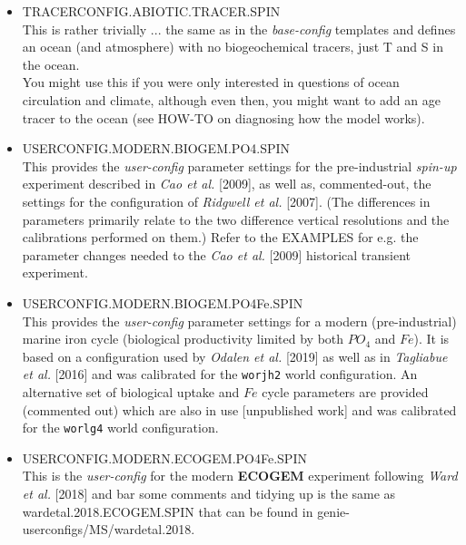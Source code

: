 \documentclass[11pt,fleqn]{book} %
\begin{document}
\begin{itemize}[noitemsep]

\vspace{2mm}
\item \textsf{\footnotesize TRACERCONFIG.ABIOTIC.TRACER.SPIN}
\vspace{1mm}
\\This is rather trivially ... the same as in the \textit{base-config} templates and defines an ocean (and atmosphere) with no biogeochemical tracers, just T and S in the ocean.
\\You might use this if you were only interested in questions of ocean circulation and climate, although even then, you might want to add an age tracer to the ocean (see HOW-TO on diagnosing how the model works).

\vspace{2mm}
\item \textsf{\footnotesize USERCONFIG.MODERN.BIOGEM.PO4.SPIN}
\vspace{1mm}
\\This provides the \textit{user-config} parameter settings for the pre-industrial \textit{spin-up} experiment described in \textit{Cao et al.} [2009], as well as, commented-out, the settings for the configuration of \textit{Ridgwell et al.} [2007]. (The differences in parameters primarily relate to the two difference vertical resolutions and the calibrations performed on them.) Refer to the EXAMPLES for e.g. the parameter changes needed to the \textit{Cao et al.} [2009] historical transient experiment. 

\vspace{2mm}
\item \textsf{\footnotesize USERCONFIG.MODERN.BIOGEM.PO4Fe.SPIN}
\vspace{1mm}
\\This provides the \textit{user-config} parameter settings for a modern (pre-industrial) marine iron cycle (biological productivity limited by both \(PO_{4}\) and \(Fe\)). It is based on a configuration used by \textit{Odalen et al.} [2019] as well as in \textit{Tagliabue et al.} [2016] and was calibrated for the \texttt{worjh2} world configuration. An alternative set of biological uptake and \(Fe\) cycle parameters are provided (commented out) which are also in use [unpublished work] and was calibrated for the \texttt{worlg4} world configuration.

\vspace{2mm}
\item \textsf{\footnotesize USERCONFIG.MODERN.ECOGEM.PO4Fe.SPIN}
\vspace{1mm}
\\This is the \textit{user-config} for the modern \textbf{ECOGEM} experiment following \textit{Ward et al.} [2018] and bar some comments and tidying up is the same as \textsf{\footnotesize wardetal.2018.ECOGEM.SPIN} that can be found in \textsf{\footnotesize genie-userconfigs/MS/wardetal.2018}.


\end{itemize}
\end{document}

